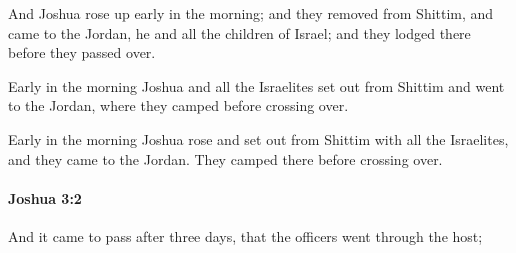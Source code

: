 			\begin{versebox}
					\item[BHS] 
					\item[ASV] And Joshua rose up early in the morning; and they removed from Shittim, and came to the Jordan, he and all the children of Israel; and they lodged there before they passed over.
					\item[NIV] Early in the morning Joshua and all the Israelites set out from Shittim and went to the Jordan, where they camped before crossing over.
					\item[NRSV] Early in the morning Joshua rose and set out from Shittim with all the Israelites, and they came to the Jordan. They camped there before crossing over.
			\end{versebox}

		\paragraph{Joshua 3:2} %
			\label{JOSHUA-3-2}

			And it came to pass after three days, that the officers went through the host;

